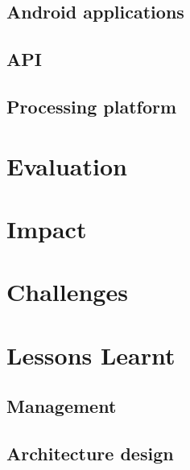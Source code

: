 \documentclass[prodmode,acmtosem]{acmsmall} %
\begin{document}
\subsection{Android applications}
\subsection{API}
\subsection{Processing platform}
\section{Evaluation}
\section{Impact}
\section{Challenges}
\section{Lessons Learnt}
\subsection{Management}
\subsection{Architecture design}
\end{document}

